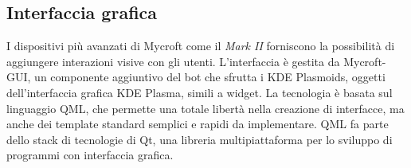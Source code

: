 \subsection{Interfaccia grafica}
I dispositivi più avanzati di Mycroft come il \textit{Mark II} forniscono la possibilità di aggiungere interazioni visive con gli utenti. L'interfaccia è gestita da Mycroft-GUI, un componente aggiuntivo del bot che sfrutta i KDE Plasmoids, oggetti dell'interfaccia grafica KDE Plasma, simili a widget. La tecnologia è basata sul linguaggio QML, che permette una totale libertà nella creazione di interfacce, ma anche dei template standard semplici e rapidi da implementare. QML fa parte dello stack di tecnologie di Qt, una libreria multipiattaforma per lo sviluppo di programmi con interfaccia grafica.